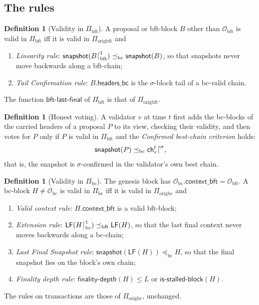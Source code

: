\documentclass[11pt,a4paper]{article}
\theoremstyle{definition}
\newtheorem{definition}[theorem]{Definition}
\newcommand{\bc}{\mathrm{bc}}
\newcommand{\bft}{\mathrm{bft}}
\newcommand{\Origin}{\mathcal{O}}
\newcommand{\Obc}{\Origin_{\bc}}
\newcommand{\Obft}{\Origin_{\bft}}
\newcommand{\preceqbc}{\preceq_{\bc}}
\newcommand{\preceqbft}{\preceq_{\bft}}
\newcommand{\ch}{\mathsf{ch}}
\newcommand{\Piorigbc}{\Pi_{\mathrm{origbc}}}
\newcommand{\Piorigbft}{\Pi_{\mathrm{origbft}}}
\newcommand{\Pibc}{\Pi_{\bc}}
\newcommand{\Pibft}{\Pi_{\bft}}
\newcommand{\bftlastfinal}{\mathsf{bft\text{-}last\text{-}final}}
\newcommand{\isstalledblock}{\mathsf{is\text{-}stalled\text{-}block}}
\newcommand{\contextbft}{\mathsf{context\_bft}}
\newcommand{\headersbc}{\mathsf{headers\_bc}}
\newcommand{\snapshot}{\mathsf{snapshot}}
\newcommand{\LF}{\mathsf{LF}}
\newcommand{\finalitydepth}{\mathsf{finality\text{-}depth}}
\begin{document}
\subsection{The rules}\label{sec:cons-rules}

\begin{definition}[Validity in $\Pibft$]\label{def:bft-validity}
A proposal or bft-block $B$ other than $\Obft$ is valid in $\Pibft$ iff it
is valid in $\Piorigbft$ and
\begin{enumerate}[label=(\roman*)]
\item \emph{Linearity rule}: $\snapshot(B\trunc[\bft]{1}) \preceqbc
  \snapshot(B)$, so that snapshots never move backwards along a bft-chain;
\item \emph{Tail Confirmation rule}: $B.\headersbc$ is the $\sigma$-block
  tail of a bc-valid chain.
\end{enumerate}
The function $\bftlastfinal$ of $\Pibft$ is that of $\Piorigbft$.
\end{definition}

\begin{definition}[Honest voting]\label{def:honest-voting}
A validator $v$ at time $t$ first adds the bc-blocks of the carried headers
of a proposal $P$ to its view, checking their validity, and then votes for
$P$ only if $P$ is valid in $\Pibft$ and the \emph{Confirmed best-chain
criterion} holds:
\[
  \snapshot(P) \preceqbc \ch_v^t\trunc{\sigma},
\]
that is, the snapshot is $\sigma$-confirmed in the validator's own best
chain.
\end{definition}

\begin{definition}[Validity in $\Pibc$]\label{def:bc-validity}
The genesis block has $\Obc.\contextbft = \Obft$. A bc-block $H \neq \Obc$ is
valid in $\Pibc$ iff it is valid in $\Piorigbc$ and
\begin{enumerate}[label=(\roman*)]
\item \emph{Valid context rule}: $H.\contextbft$ is a valid bft-block;
\item \emph{Extension rule}: $\LF(H\trunc[\bc]{1}) \preceqbft \LF(H)$, so
  that the last final context never moves backwards along a bc-chain;
\item \emph{Last Final Snapshot rule}: $\snapshot(\LF(H)) \preceqbc H$, so
  that the final snapshot lies on the block's own chain;
\item \emph{Finality depth rule}: $\finalitydepth(H) \le L$ or
  $\isstalledblock(H)$.
\end{enumerate}
The rules on transactions are those of $\Piorigbc$, unchanged.
\end{definition}
\end{document}
